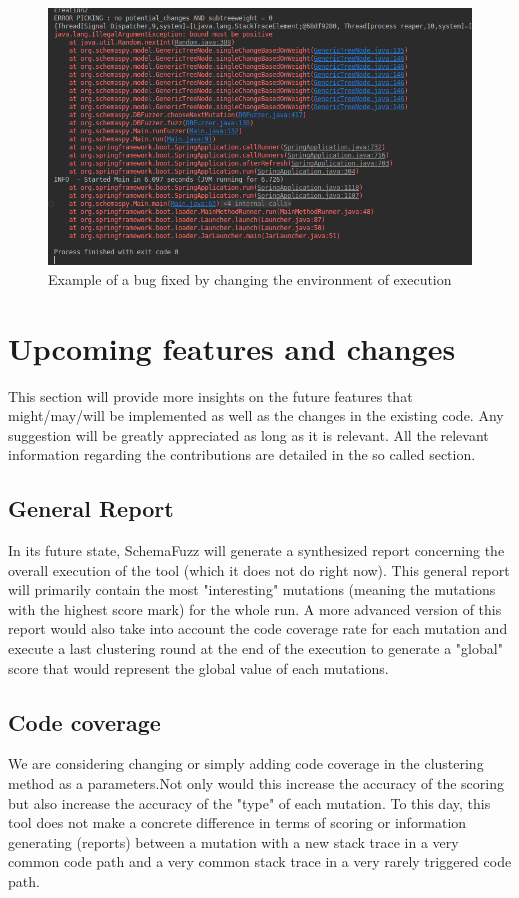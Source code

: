 \documentclass{article}
\begin{document}
\begin{empfile}
		\bigskip
		\begin{figure} [h!]
			\includegraphics[width=\textwidth]{sc4.png}
			\caption{Example of a bug fixed by changing the environment of execution}
		\end{figure}
		\bigskip
   	       		
		
			\clearpage
	\section{Upcoming features and changes}
This section will provide more insights on the future features that might/may/will be implemented as well as the changes in the existing code.
Any suggestion will be greatly appreciated as long as it is relevant. All the relevant information regarding the contributions are detailed in the so called section.

		\subsection{General Report}
In its future state, SchemaFuzz will generate a synthesized report concerning the overall execution of the tool (which it does not do right now). This general report will primarily contain the most "interesting" mutations (meaning the mutations with the highest score mark) for the whole run.
A more advanced version of this report would also take into account the code coverage rate for each mutation and execute a last clustering round at the end of the execution to generate a "global" score that would represent the global value of each mutations.
	
		\subsection{Code coverage}
We are considering changing or simply adding code coverage in the clustering method as a parameters.Not only would this increase the accuracy of the scoring but also increase the accuracy of the "type" of each mutation. To this day, this tool does not make a concrete difference in terms of scoring or information generating (reports) between a mutation with a new stack trace in a very common code path and a very common stack trace in a very rarely triggered code path.


\end{empfile}
\end{document}
